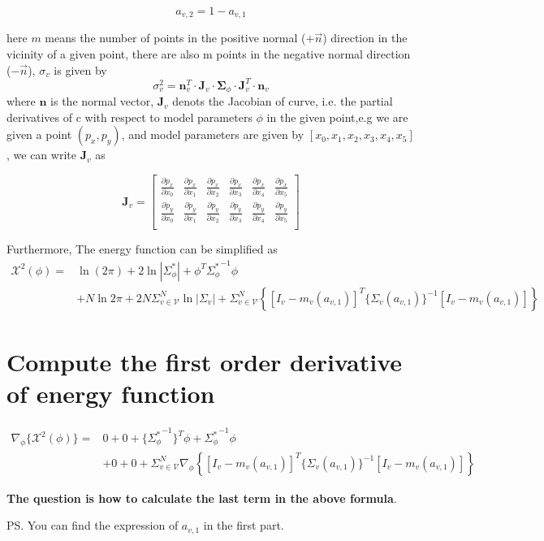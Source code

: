 \documentclass[11pt]{article}
\begin{document}
\begin{displaymath}
a_{v,2} = 1- a_{v,1}
\end{displaymath}


here $m$ means the number of points in the positive normal ($+\vec{n}$)
direction in the vicinity of a given point, there are also m points in
the negative normal direction ($-\vec{n}$), $\sigma_{v}$ is given by
\begin{displaymath}
\sigma_v^2 = \mathbf{n}_v^T\cdot
\mathbf{J}_v \cdot \mathbf{\Sigma}_{\phi}\cdot \mathbf{J}_v^T\cdot \mathbf{n}_v
\end{displaymath}
where $\mathbf{n}$ is the normal vector, $\mathbf{J}_v$ denots the Jacobian of curve, i.e. the partial derivatives
of c with respect to model parameters $\phi$ in the given point,e.g we
are given a point $(p_x,p_{y})$, and model parameters are given by
$\left[ x_0, x_1, x_2, x_3, x_4, x_5 \right]$, we can write $\mathbf{J}_v$ as

\[
\mathbf{J}_v =
\left[ {\begin{array}{cccccc}
\frac{\partial p_x}{\partial x_0}& \frac{\partial p_x}{\partial x_1}& \frac{\partial p_x}{\partial x_2}& \frac{\partial p_x}{\partial x_3}&\frac{\partial p_x}{\partial x_4} &\frac{\partial p_x}{\partial x_5}  \\
\frac{\partial p_y}{\partial x_0}& \frac{\partial p_y}{\partial x_1}& \frac{\partial p_y}{\partial x_2}& \frac{\partial p_y}{\partial x_3}&\frac{\partial p_y}{\partial x_4} &\frac{\partial p_y}{\partial x_5}  \\
 \end{array} } \right]
\]

Furthermore, The energy function can be simplified as 
\begin{align*}
\mathcal{X}^2(\phi) = & \ln{(2\pi)} + 2\ln{|\Sigma_{\phi}^{*}|} + {\phi}^T{\Sigma_{\phi}^{*}}^{-1}\phi
 \\ & + N\ln{2\pi} + 2N\Sigma_{v \in \mathcal{V}}^{N}{\ln{|\Sigma_v|}} + \Sigma_{v \in \mathcal{V}}^{N} 
\left\{{\left[I_{v}-m_v(a_{v,1})\right]^T\{\Sigma_{v}(a_{v,1})\}^{-1}\left[I_{v}-m_v(a_{v,1})\right]}\right\}
\end{align*}
\section{Compute the first order derivative of energy function}
\label{sec-2}

\begin{align*}
\nabla_{\phi}\{{\mathcal{X}^2(\phi)}\} = & 0 + 0
+ \{{\Sigma_{\phi}^{*}}^{-1}\}^{T}{\phi} + {\Sigma_{\phi}^{*}}^{-1}\phi
 \\ & + 0 + 0 + \Sigma_{v \in \mathcal{V}}^{N} \nabla_{\phi}\left\{
{\left[I_{v}-m_v(a_{v,1})\right]^T\{\Sigma_{v}(a_{v,1})\}^{-1}\left[I_{v}-m_v(a_{v,1})\right]}\right\}
\end{align*}

\textbf{The question is how to calculate the last term in the above formula}.

PS. You can find the expression of $a_{v,1}$ in the first part.
\end{document}
